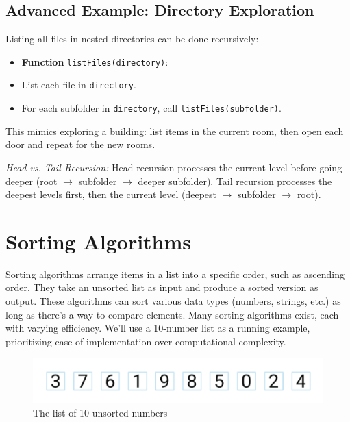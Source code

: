 \documentclass[12pt, a4paper]{article}
\begin{document}
\subsection{Advanced Example: Directory Exploration}

Listing all files in nested directories can be done recursively:

\begin{itemize}
    \item \textbf{Function} \texttt{listFiles(directory)}:
    \item List each file in \texttt{directory}.
    \item For each subfolder in \texttt{directory}, call \texttt{listFiles(subfolder)}.
\end{itemize}

This mimics exploring a building: list items in the current room, then open each door and repeat for the new rooms.


\textit{Head vs. Tail Recursion:} Head recursion processes the current level before going deeper (root $\to$ subfolder $\to$ deeper subfolder). Tail recursion processes the deepest levels first, then the current level (deepest $\to$ subfolder $\to$ root).


\section{Sorting Algorithms}

Sorting algorithms arrange items in a list into a specific order, such as ascending order.  They take an unsorted list as input and produce a sorted version as output. These algorithms can sort various data types (numbers, strings, etc.) as long as there's a way to compare elements. Many sorting algorithms exist, each with varying efficiency. We'll use a 10-number list as a running example, prioritizing ease of implementation over computational complexity.

\begin{figure}[h]
    \centering
    \includegraphics[width=\textwidth]{images/10-number_list.png}
    \caption{The list of 10 unsorted numbers}
    \label{fig:bubble_sort}
\end{figure}
\end{document}

